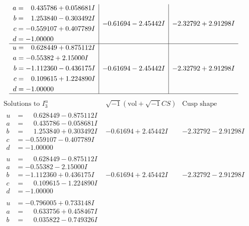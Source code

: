 \documentclass[1p]{elsarticle_modified}
\theoremstyle{definition}
\newcommand{\I}{\sqrt{-1}}
\begin{document}
$$\begin{array}{c|c|c}
\begin{aligned}
a &= \phantom{-}0.435786 + 0.058681 I \\
b &= \phantom{-}1.253840 - 0.303492 I \\
c &= -0.559107 + 0.407789 I \\
d &= -1.00000\phantom{ +0.000000I}\end{aligned}
 & -0.61694 - 2.45442 I & -2.32792 + 2.91298 I \\ \hline\begin{aligned}
u &= \phantom{-}0.628449 + 0.875112 I \\
a &= -0.55382 + 2.15000 I \\
b &= -1.112360 - 0.436175 I \\
c &= \phantom{-}0.109615 + 1.224890 I \\
d &= -1.00000\phantom{ +0.000000I}\end{aligned}
 & -0.61694 - 2.45442 I & -2.32792 + 2.91298 I\\
 \hline 
 \end{array}$$\newpage$$\begin{array}{c|c|c}  
\text{Solutions to }I^u_{3}& \I (\text{vol} + \sqrt{-1}CS) & \text{Cusp shape}\\
 \hline 
\begin{aligned}
u &= \phantom{-}0.628449 - 0.875112 I \\
a &= \phantom{-}0.435786 - 0.058681 I \\
b &= \phantom{-}1.253840 + 0.303492 I \\
c &= -0.559107 - 0.407789 I \\
d &= -1.00000\phantom{ +0.000000I}\end{aligned}
 & -0.61694 + 2.45442 I & -2.32792 - 2.91298 I \\ \hline\begin{aligned}
u &= \phantom{-}0.628449 - 0.875112 I \\
a &= -0.55382 - 2.15000 I \\
b &= -1.112360 + 0.436175 I \\
c &= \phantom{-}0.109615 - 1.224890 I \\
d &= -1.00000\phantom{ +0.000000I}\end{aligned}
 & -0.61694 + 2.45442 I & -2.32792 - 2.91298 I \\ \hline\begin{aligned}
u &= -0.796005 + 0.733148 I \\
a &= \phantom{-}0.633756 + 0.458467 I \\
b &= \phantom{-}0.035822 - 0.749326 I \\

\end{aligned}
\end{array}$$
\end{document}
